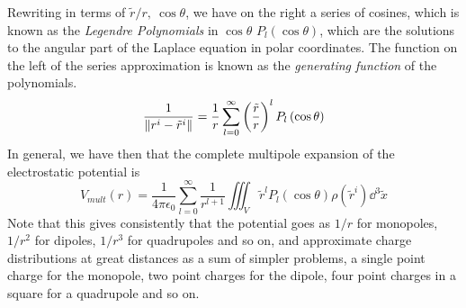 \documentclass[../electromagnetism]{subfiles}
\begin{document}
Rewriting in terms of $\tilde{r}/r,\ \cos\theta$, we have on the right a series of cosines, which is known as the \textit{Legendre Polynomials} in $\cos\theta$ $P_l(\cos\theta)$, which are the solutions to the angular part of the Laplace equation in polar coordinates. The function on the left of the series approximation is known as the \textit{generating function} of the polynomials.
\begin{equation}
	\frac{1}{\norm{r^i-\tilde{r}^i}}=\frac{1}{r}\sum_{l=0}^\infty\left( \frac{\tilde{r}}{r} \right)^lP_l\left( \cos\theta \right)
	\label{eq:legendrepol}
\end{equation}
In general, we have then that the complete multipole expansion of the electrostatic potential is
\begin{equation}
	V_{mult}(r)=\frac{1}{4\pi\epsilon_0}\sum_{l=0}^\infty\frac{1}{r^{l+1}}\iiint_V\tilde{r}^lP_l\left( \cos\theta \right)\rho\left( \tilde{r}^i \right)\dd^3\tilde{x}
	\label{eq:multipolepot}
\end{equation}
Note that this gives consistently that the potential goes as $1/r$ for monopoles, $1/r^2$ for dipoles, $1/r^3$ for quadrupoles and so on, and approximate charge distributions at great distances as a sum of simpler problems, a single point charge for the monopole, two point charges for the dipole, four point charges in a square for a quadrupole and so on.
\end{document}
